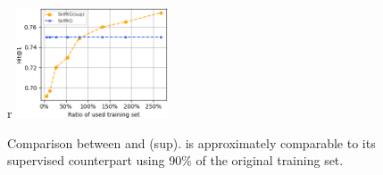 \begin{figure}{r}{}
    \centering
    \includegraphics[width=4.5cm]{img/sup.png}
    \caption{Comparison between \solution and \solution(sup). \solution is approximately comparable to its supervised counterpart using 90\% of the original training set.}
    \label{fig:sup}
\end{figure}